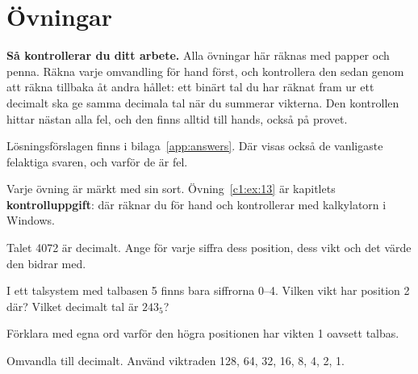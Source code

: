 %

\section{Övningar}
\label{c1:sec:exercises}\label{c1:app:c}

\begin{aside}
\textbf{Så kontrollerar du ditt arbete.} Alla övningar här räknas med papper och penna. Räkna varje
omvandling för hand först, och kontrollera den sedan genom att räkna tillbaka åt andra hållet: ett
binärt tal du har räknat fram ur ett decimalt ska ge samma decimala tal när du summerar vikterna.
Den kontrollen hittar nästan alla fel, och den finns alltid till hands, också på provet.

Lösningsförslagen finns i bilaga~\ref{app:answers}. Där visas också de vanligaste felaktiga
svaren, och varför de är fel.

Varje övning är märkt med sin sort. Övning~\ref{c1:ex:13} är kapitlets
\textbf{kontrolluppgift}: där räknar du för hand och kontrollerar med kalkylatorn i Windows.
\end{aside}

\label{c1:ex:1}
\begin{parts}
  \item Talet 4072 är decimalt. Ange för varje siffra dess position, dess vikt och det värde den
    bidrar med.
  \item I ett talsystem med talbasen 5 finns bara siffrorna 0--4. Vilken vikt har position 2 där?
    Vilket decimalt tal är $243_5$?
  \item Förklara med egna ord varför den högra positionen har vikten 1 oavsett talbas.
\end{parts}

\label{c1:ex:2}
Omvandla till decimalt. Använd viktraden 128, 64, 32, 16, 8, 4, 2, 1.
\begin{parts}
  \item {}
  \item {}
  \item {}
  \item {}
  \item {}
  \item {}
\end{parts}

